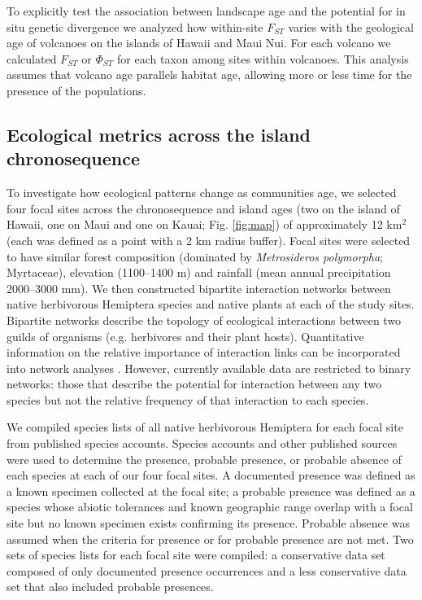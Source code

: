 To explicitly test the association between landscape age and the
potential for in situ genetic divergence we analyzed how within-site
$F_{ST}$ varies with the geological age of volcanoes on the islands of
Hawaii and Maui Nui. For each volcano we calculated $F_{ST}$ or
$\Phi_{ST}$ \citep{arlequin} for each taxon among sites within
volcanoes. This analysis assumes that volcano age parallels habitat
age, allowing more or less time for the presence of the populations.



\subsection{Ecological metrics across the island chronosequence}

To investigate how ecological patterns change as communities age, we
selected four focal sites across the chronosequence and island ages
(two on the island of Hawaii, one on Maui and one on Kauai;
Fig. \ref{fig:map}) of approximately 12 km$^2$ (each was defined as a
point with a 2 km radius buffer). Focal sites were selected to have
similar forest composition (dominated by \textit{Metrosideros
  polymorpha}; Myrtaceae), elevation (1100--1400 m) and rainfall (mean
annual precipitation 2000--3000 mm). We then constructed bipartite
interaction networks between native herbivorous Hemiptera species and
native plants at each of the study sites. Bipartite networks describe
the topology of ecological interactions between two guilds of
organisms (e.g. herbivores and their plant hosts). Quantitative
information on the relative importance of interaction links can be
incorporated into network analyses \citep{vazquez2009}. However,
currently available data are restricted to binary networks: those that
describe the potential for interaction between any two species but not
the relative frequency of that interaction to each species.

We compiled species lists of all native herbivorous Hemiptera for each
focal site from published species accounts. Species accounts and other
published sources were used to determine the presence, probable
presence, or probable absence of each species at each of our four
focal sites. A documented presence was defined as a known specimen
collected at the focal site; a probable presence was defined as a
species whose abiotic tolerances and known geographic range overlap
with a focal site but no known specimen exists confirming its
presence. Probable absence was assumed when the criteria for presence
or for probable presence are not met. Two sets of species lists for
each focal site were compiled: a conservative data set composed of
only documented presence occurrences and a less conservative data set
that also included probable presences.

